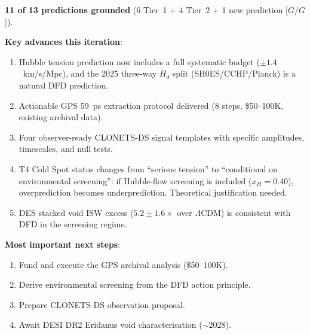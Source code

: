 \documentclass[11pt,a4paper]{article}
\newcommand{\Hzero}{H_0}
\newcommand{\LCDM}{$\Lambda$CDM}
\begin{document}
\begin{tcolorbox}[colback=yellow!5!white, colframe=blue!60!black,
  title=\textbf{W4i10 P5 Net Assessment}]

\textbf{11 of 13 predictions grounded} (6 Tier~1 + 4 Tier~2 +
1 new prediction [$\dot{G}/G$]).

\textbf{Key advances this iteration}:
\begin{enumerate}[nosep]
\item Hubble tension prediction now includes a full systematic budget
  ($\pm 1.4$~km/s/Mpc), and the 2025 three-way $\Hzero$ split
  (SH0ES/CCHP/Planck) is a natural DFD prediction.
\item Actionable GPS 59~ps extraction protocol delivered (8 steps,
  \$50--100K, existing archival data).
\item Four observer-ready CLONETS-DS signal templates with specific
  amplitudes, timescales, and null tests.
\item T4 Cold Spot status changes from ``serious tension'' to
  ``conditional on environmental screening'': if Hubble-flow
  screening is included ($x_H = 0.40$), overprediction becomes
  underprediction. Theoretical justification needed.
\item DES stacked void ISW excess ($5.2 \pm 1.6\times$ over \LCDM)
  is consistent with DFD in the screening regime.
\end{enumerate}

\textbf{Most important next steps}:
\begin{enumerate}[nosep]
\item Fund and execute the GPS archival analysis (\$50--100K).
\item Derive environmental screening from the DFD action principle.
\item Prepare CLONETS-DS observation proposal.
\item Await DESI DR2 Eridanus void characterisation ($\sim 2028$).
\end{enumerate}

\end{tcolorbox}
\end{document}
